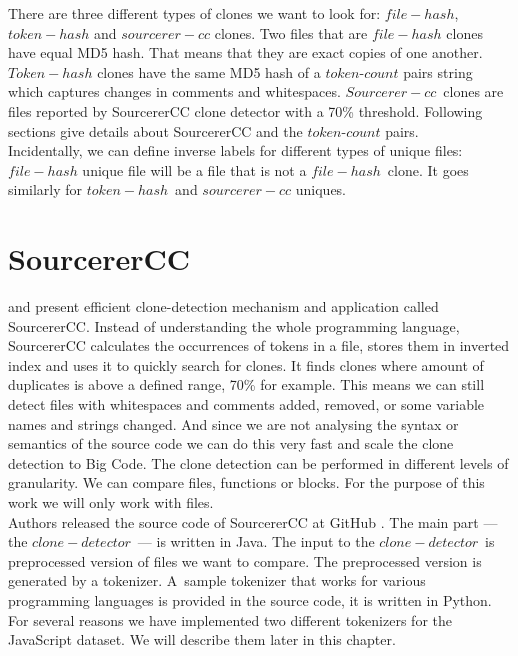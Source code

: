 \documentclass[thesis=M,english]{FITthesis}[2012/10/20]
\begin{document}
There are three different types of clones we want to look for: $file-hash$, $token-hash$ and $sourcerer-cc$ clones. Two files that are $file-hash$ clones have equal MD5 hash. That means that they are exact copies of one another. $Token-hash$ clones have the same MD5 hash of a $token$-$count$ pairs string which captures changes in comments and whitespaces. $Sourcerer-cc$ clones are files reported by SourcererCC clone detector with a 70\% threshold. Following sections give details about SourcererCC and the $token$-$count$ pairs. \\

Incidentally, we can define inverse labels for different types of unique files: $file-hash$ unique file will be a file that is not a $file-hash$ clone. It goes similarly for $token-hash$ and $sourcerer-cc$ uniques. \\

\section{SourcererCC}

\cite{scc_pre} and \cite{scc_1} present efficient clone-detection mechanism and application called SourcererCC. Instead of understanding the whole programming language, SourcererCC calculates the occurrences of tokens in a file, stores them in inverted index and uses it to quickly search for clones. It finds clones where amount of duplicates is above a defined range, 70\% for example. This means we can still detect files with whitespaces and comments added, removed, or some variable names and strings changed. And since we are not analysing the syntax or semantics of the source code we can do this very fast and scale the clone detection to Big Code. The clone detection can be performed in different levels of granularity. We can compare files, functions or blocks. For the purpose of this work we will only work with files. \\

Authors released the source code of SourcererCC at GitHub \cite{scc_gh}. The main part — the $clone-detector$ — is written in Java. The input to the $clone-detector$ is preprocessed version of files we want to compare. The preprocessed version is generated by a tokenizer. A~sample tokenizer that works for various programming languages is provided in the source code, it is written in Python. For several reasons we have implemented two different tokenizers for the JavaScript dataset. We will describe them later in this chapter. \\
\end{document}
